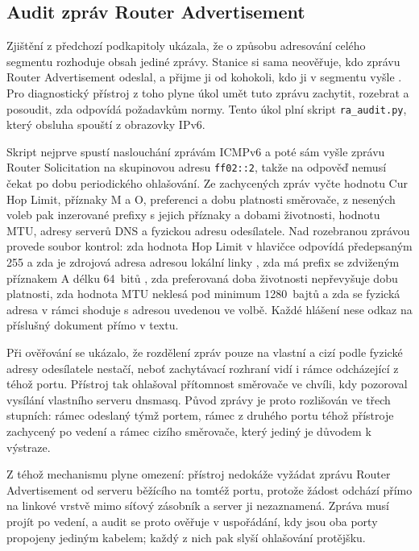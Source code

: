 \subsection{Audit zpráv Router Advertisement}
\label{sec:audit_ra}

Zjištění z předchozí podkapitoly ukázala, že o způsobu adresování celého segmentu rozhoduje obsah jediné zprávy. Stanice si sama neověřuje, kdo zprávu Router Advertisement odeslal, a přijme ji od kohokoli, kdo ji v segmentu vyšle \cite{rfc4861}. Pro diagnostický přístroj z toho plyne úkol umět tuto zprávu zachytit, rozebrat a posoudit, zda odpovídá požadavkům normy. Tento úkol plní skript \texttt{ra\_audit.py}, který obsluha spouští z obrazovky IPv6.

Skript nejprve spustí naslouchání zprávám ICMPv6 a poté sám vyšle zprávu Router Solicitation na skupinovou adresu \texttt{ff02::2}, takže na odpověď nemusí čekat po dobu periodického ohlašování. Ze zachycených zpráv vyčte hodnotu Cur Hop Limit, příznaky M a O, preferenci a dobu platnosti směrovače, z nesených voleb pak inzerované prefixy s jejich příznaky a dobami životnosti, hodnotu MTU, adresy serverů DNS a fyzickou adresu odesílatele. Nad rozebranou zprávou provede soubor kontrol: zda hodnota Hop Limit v hlavičce odpovídá předepsaným 255 a zda je zdrojová adresa adresou lokální linky \cite{rfc4861}, zda má prefix se zdviženým příznakem A délku 64~bitů \cite{rfc4862}, zda preferovaná doba životnosti nepřevyšuje dobu platnosti, zda hodnota MTU neklesá pod minimum 1280~bajtů \cite{rfc8200} a zda se fyzická adresa v rámci shoduje s adresou uvedenou ve volbě. Každé hlášení nese odkaz na příslušný dokument přímo v textu.

Při ověřování se ukázalo, že rozdělení zpráv pouze na vlastní a cizí podle fyzické adresy odesílatele nestačí, neboť zachytávací rozhraní vidí i rámce odcházející z téhož portu. Přístroj tak ohlašoval přítomnost směrovače ve chvíli, kdy pozoroval vysílání vlastního serveru dnsmasq. Původ zprávy je proto rozlišován ve třech stupních: rámec odeslaný týmž portem, rámec z druhého portu téhož přístroje zachycený po vedení a rámec cizího směrovače, který jediný je důvodem k výstraze.

Z téhož mechanismu plyne omezení: přístroj nedokáže vyžádat zprávu Router Advertisement od serveru běžícího na tomtéž portu, protože žádost odchází přímo na linkové vrstvě mimo síťový zásobník a server ji nezaznamená. Zpráva musí projít po vedení, a audit se proto ověřuje v uspořádání, kdy jsou oba porty propojeny jediným kabelem; každý z nich pak slyší ohlašování protějšku.

